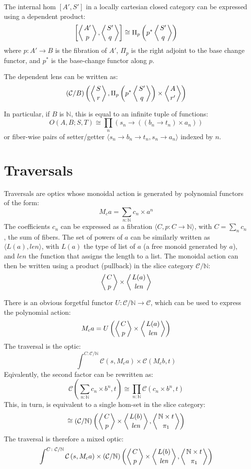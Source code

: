 \documentclass[11pt]{amsart}
\begin{document}
The internal hom $[A', S']$ in a locally cartesian closed category can be expressed using a dependent product:
\[ \left [\left \langle A' \atop p \right \rangle, \left \langle S' \atop q \right \rangle \right ] \cong \Pi_p \left(p^* \left \langle S' \atop q \right \rangle \right)\]
where $p \colon A' \to B$ is the fibration of $A'$, $\Pi_p$ is the right adjoint to the base change functor, and $p^*$ is the base-change functor along $p$.

The dependent lens can be written as:
\[ (\mathcal{C} / B) \left( \left \langle S \atop r \right \rangle, \Pi_p \left(p^* \left \langle S' \atop q \right \rangle \right) \times \left \langle A \atop r' \right \rangle \right) \]

In particular, if $B$ is $\mathbb{N}$, this is equal to an infinite tuple of functions:
\[O(A, B; S, T) \cong \prod_n \left( s_n \to \left((b_n \to t_n) \times a_n \right) \right) \]
or fiber-wise pairs of setter/getter $\langle s_n \to b_n \to t_n, s_n \to a_n \rangle$ indexed by $n$.

\section{Traversals}

Traversals are optics whose monoidal action is generated by polynomial functors of the form:
\[ M_{c} a = \sum_{n \colon \mathbb{N}} c_n \times a^n \]
The coefficients $c_n$ can be expressed as a fibration $ \langle C, p \colon C \to \mathbb{N} \rangle$, with $C = \sum_n c_n$, the sum of fibers. The set of powers of $a$ can be similarly written as $\langle L(a), \mathit{len} \rangle$, with $L(a)$ the type of list of $a$ (a free monoid generated by $a$), and $\mathit{len}$ the function that assigns the length to a list. The monoidal action can then be written using a product (pullback) in the slice category $\mathcal{C}/\mathbb{N}$:
\[ \left \langle {C \atop p} \right \rangle \times \left \langle {L(a) \atop \mathit{len}} \right \rangle \]

There is an obvious forgetful functor $U \colon \mathcal{C}/\mathbb{N} \to \mathcal{C}$, which can be used to express the polynomial action:
\[ M_c a = U\left( 
  \left \langle {C \atop p} \right \rangle \times \left \langle {L(a) \atop \mathit{len}} \right \rangle \right) \]
The traversal is the optic:
\[ \int^{C \colon \mathcal{C}/\mathbb{N}} \mathcal{C} 
\left(s, M_c a \right)  
  \times \mathcal{C}(M_c b, t) \]
Eqivalently, the second factor can be rewritten as:
\[  \mathcal{C}( \sum_{n \colon \mathbb{N}} c_n \times b^n, t) \cong \prod_{n \colon  \mathbb{N}}  \mathcal{C}(c_n \times b^n, t)\]
This, in turn, is equivalent to a single hom-set in the slice category:
\[ 
 \cong  
(\mathcal{C}/\mathbb{N})\left(\left \langle {C \atop p} \right \rangle \times \left \langle {L(b) \atop \mathit{len}} \right \rangle, \left \langle {\mathbb{N} \times t \atop \pi_1} \right \rangle \right) \]
The traversal is therefore a mixed optic:
\[ \int^{C \colon \mathcal{C}/\mathbb{N}} \mathcal{C} 
\left(s,  M_c a \right)  
  \times (\mathcal{C}/\mathbb{N})\left( \left \langle {C \atop p} \right \rangle 
  \times \left \langle {L(b) \atop \mathit{len}} \right \rangle, \left \langle {\mathbb{N} \times t \atop \pi_1} \right \rangle \right) \]
\end{document}
